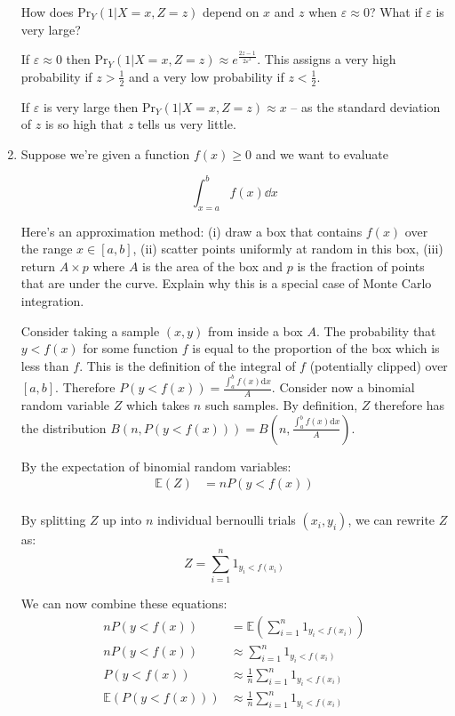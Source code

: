 \documentclass[10pt,\jkfside,a4paper]{article}
\begin{document}
\begin{enumerate}
How does $\text{Pr}_Y\left( 1 | X = x, Z = z \right)$ depend on $x$ and $z$
when $\varepsilon \approx 0$? What if $\varepsilon$ is very large?

If $\varepsilon \approx 0$ then $\text{Pr}_Y\left( 1 | X = x, Z = z \right)
\approx e^{\frac{2z - 1}{2\varepsilon^2}}$. This assigns a very high
probability if $z > \frac{1}{2}$ and a very low probability if $z <
\frac{1}{2}$.

If $\varepsilon$ is very large then $\text{Pr}_Y\left( 1 | X = x, Z = z
\right) \approx x$ -- as the standard deviation of $z$ is so high that $z$
tells us very little.

\item Suppose we're given a function $f(x) \geq 0$ and we want to evaluate

\[
\int^b_{x=a} f(x) \dd{x}
\]

Here's an approximation method: (i) draw a box that contains $f(x)$ over the
range $x \in \left[ a, b \right] $, (ii) scatter points uniformly at random
in this box, (iii) return $A \times p$ where $A$ is the area of the box and
$p$ is the fraction of points that are under the curve. Explain why this is
a special case of Monte Carlo integration.

Consider taking a sample $(x, y)$ from inside a box $A$. The probability
that $y < f(x)$ for some function $f$ is equal to the proportion of the box
which is less than $f$. This is the definition of the integral of $f$
(potentially clipped) over $[a, b]$. Therefore $P(y < f(x)) =
\frac{\int^b_a f(x)\text{d}x}{A}$. Consider now a binomial random variable
$Z$ which takes $n$ such samples. By definition, $Z$ therefore has the
distribution $B(n, P(y < f(x))) = B\left(n, \frac{\int^b_a f(x)
\text{d}x}{A}\right)$.

By the expectation of binomial random variables:
\[
\begin{split}
\mathbb{E}\left( Z \right) &= nP(y < f(x)) \\
\end{split}
\]

By splitting $Z$ up into $n$ individual bernoulli trials $(x_i, y_i)$, we can
rewrite $Z$ as:
\[
Z = \sum^n_{i=1} 1_{y_i < f(x_i)}
\]

We can now combine these equations:
\[
\begin{split}
nP(y < f(x)) &= \mathbb{E}\left(\sum^n_{i=1} 1_{y_i < f(x_i)}\right) \\
nP(y < f(x)) &\approx \sum^n_{i=1} 1_{y_i < f(x_i)} \\
P(y < f(x)) &\approx \frac{1}{n}\sum^n_{i=1} 1_{y_i < f(x_i)} \\
\mathbb{E}\left(P(y < f(x))\right) &\approx \frac{1}{n}\sum^n_{i=1} 1_{y_i < f
(x_i)
} \\
\end{split}
\]


\end{enumerate}
\end{document}
